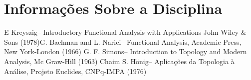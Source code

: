 \documentclass[12pt]{article}
\theoremstyle{definition}
\begin{document}
\tableofcontents

\newpage

\section{Informações Sobre a Disciplina}


\newpage

\newpage

\newpage

\newpage

\newpage

\newpage

\newpage

\newpage

\newpage

\newpage

\newpage

\newpage

\newpage

\newpage

\newpage

\begin{thebibliography}{99}
		E Kreyszig-- Introductory Functional Analysis with Applications John Wiley \& Sons (1978)G.
	Bachman and L. Narici-- Functional Analysis, Academic Press, New York-London (1966)
	G. F. Simons-- Introduction to Topology and Modern Analysis, Mc Graw-Hill (1963)
	Chaim S. Hönig-- Aplicações da Topologia à Análise, Projeto Euclides, CNPq-IMPA (1976)
\end{thebibliography}
\end{document}
